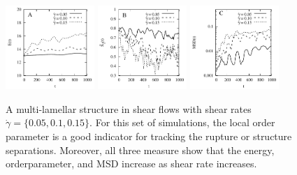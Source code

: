 \documentclass[aps,prl,preprint,groupedaddress]{revtex4-2}
\begin{document}
\begin{figure}
  \begin{center}
  \includegraphics[width=0.3\textwidth]{MS_E.pdf}
   \includegraphics[width=0.3\textwidth]{MS_LOP.pdf}
    \includegraphics[width=0.3\textwidth]{MS_MSD.pdf}
  \end{center}
      \caption{\label{fig:BC2_shear} 
      A multi-lamellar structure in shear flows with shear rates $\dot\gamma=\{0.05, 0.1, 0.15\}$. For this set of simulations, the local order parameter is a good indicator for tracking the rupture or structure separations. Moreover, all three measure show that the energy, orderparameter, and MSD increase as shear rate increases.}
\end{figure}
\end{document}
